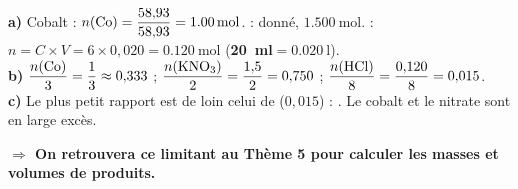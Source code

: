 \documentclass[11pt,a4paper]{article}
\newcommand{\rep}[1]{\par\smallskip\noindent\textbf{\color{corrcol}$\Rightarrow$ #1}}
\begin{document}
\begin{cor}
\textbf{a)} Cobalt : $n(\ce{Co})=\dfrac{58{,}93}{58{,}93}=\SI{1,00}{\mole}$.\quad
{} : donné, $\SI{1,500}{\mole}$.\quad
{} : $n=C\times V=6\times0{,}020=\SI{0,120}{\mole}$
(\textbf{\SI{20}{\milli\litre}$=\SI{0,020}{\litre}$}).\\
\textbf{b)} $\dfrac{n(\ce{Co})}{3}=\dfrac{1}{3}\approx0{,}333$ ;\quad
$\dfrac{n(\ce{KNO3})}{2}=\dfrac{1{,}5}{2}=0{,}750$ ;\quad
$\dfrac{n(\ce{HCl})}{8}=\dfrac{0{,}120}{8}=0{,}015$.\\
\textbf{c)} Le plus petit rapport est de loin celui de  ($0{,}015$) :
. Le cobalt et le nitrate sont en large excès.
\rep{On retrouvera ce limitant au Thème 5 pour calculer les masses et volumes de produits.}
\end{cor}
\end{document}
